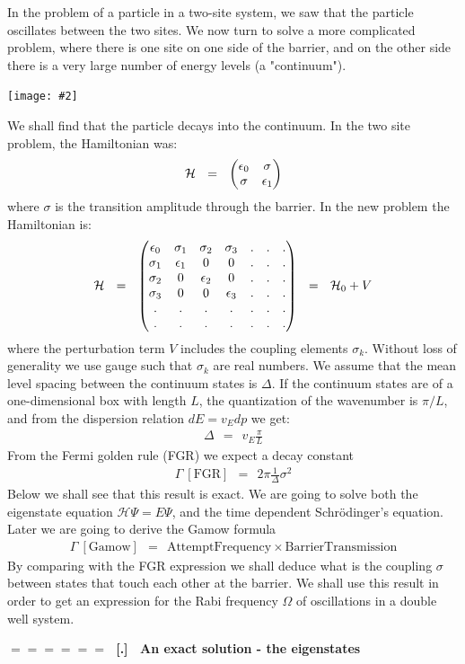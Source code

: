 \documentclass[onecolumn,fleqn]{revtex4}
\newcommand{\amatrix}[1]{\begin{matrix} #1 \end{matrix}}
\newcommand{\putgraph}[2][0.30\hsize]{\texttt{[image: \#2]}}
\newcommand{\beq}{\begin{eqnarray}}
\newcommand{\eeq}{\end{eqnarray}}
\renewcommand{\thesubsection}{\arabic{subsection}}
\renewcommand{\thesubsubsection}{\arabic{subsubsection}}
\newcommand{\sheadC}[1]
{
\addtocounter{subsubsection}{1}
\vspace{5mm}
{\Large\bf $=\!=\!=\!=\!=\!=\;$ [\thesubsection.\thesubsubsection] \ #1}  
\nopagebreak
\phantomsection
}
\begin{document}
In the problem of a particle in a two-site system, we saw that 
the particle oscillates between the two sites. We now turn 
to solve a more complicated problem, where there is one site 
on one side of the barrier, and on the other side there is 
a very large number of energy levels (a "continuum").


\begin{center}
\putgraph[0.4\hsize]{DiscreteLevelCoupledToContinuum2}
\end{center}


We shall find that the particle decays into the continuum. 
In the two site problem, the Hamiltonian was:
\beq
\mathcal{H} \ \ = \ \ \left(\amatrix{\epsilon_0 &\sigma \cr \sigma& \epsilon_1}\right) 
\eeq
where ${\sigma}$ is the transition amplitude through the barrier. 
In the new problem the Hamiltonian is:
\beq
\mathcal{H} 
\ \ = \ \ 
\left( 
\amatrix{ 
\epsilon_0 & \sigma_1 & \sigma_2 & \sigma_3 & . & . & . \cr 
\sigma_1 & \epsilon_1 & 0 & 0 & . & . & . \cr 
\sigma_2 & 0 & \epsilon_2 & 0 & . & . & . \cr 
\sigma_3 & 0 & 0 & \epsilon_3 & . & . & . \cr . & . & . & . & . & . & . \cr
. & . & . & . & . & . & . } 
\right) 
\ \ = \ \ \mathcal{H}_0 + V 
\eeq
where the perturbation term ${V}$ includes the coupling elements ${\sigma_k}$. 
Without loss of generality we use gauge such that $\sigma_k$ are real numbers.
We assume that the mean level spacing between the continuum states is ${\Delta}$. 
If the continuum states are of a one-dimensional box with length ${L}$, 
the quantization of the wavenumber is ${{\pi}/{L}}$, 
and from the dispersion relation ${dE = v_E dp}$ we get:
\beq
\Delta \ \ = \ \ v_E \frac{ \pi}{L} 
\eeq
From the Fermi golden rule (FGR) we expect a decay constant 
\beq
\Gamma \ [\mbox{FGR}] \ \ = \ \ 2\pi \frac{1}{\Delta} \sigma^2 
\eeq
Below we shall see that this result is exact. 
We are going to solve both the 
eigenstate equation ${\mathcal{H}\Psi = E \Psi}$, 
and the time dependent Schr\"{o}dinger's equation.
Later we are going to derive the Gamow formula 
\beq
\Gamma \ [\mbox{Gamow}] \ \ = \ \ \mbox{AttemptFrequency} \times \mbox{BarrierTransmission}
\eeq
By comparing with the FGR expression we shall deduce what 
is the coupling $\sigma$ between states that touch  
each other at the barrier. We shall use this result in 
order to get an expression for the Rabi frequency $\Omega$ 
of oscillations in a double well system. 


\sheadC{An exact solution - the eigenstates} 
\end{document}
